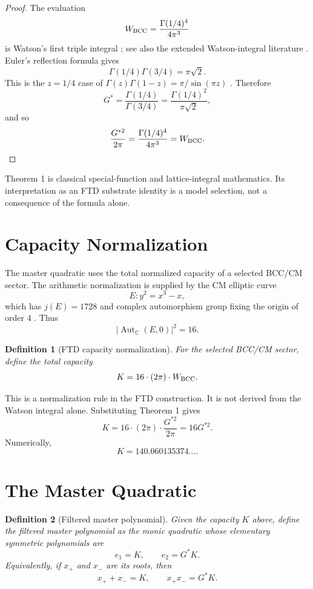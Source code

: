 \documentclass[11pt,letterpaper]{article}
\newtheorem{definition}{Definition}
\begin{document}
\begin{proof}
The evaluation
\[
W_{\rm BCC}=\frac{\Gamma(1/4)^4}{4\pi^3}
\]
is Watson's first triple integral \cite{Watson1939,MathWorldWatson}; see also
the extended Watson-integral literature \cite{GlasserZucker1977,JoyceZucker2005}.
Euler's reflection formula gives
\[
\Gamma(1/4)\Gamma(3/4)=\pi\sqrt{2}.
\]
This is the $z=1/4$ case of
$\Gamma(z)\Gamma(1-z)=\pi/\sin(\pi z)$ \cite{DLMFReflection}.
Therefore
\[
G^*=\frac{\Gamma(1/4)}{\Gamma(3/4)}
   =\frac{\Gamma(1/4)^2}{\pi\sqrt{2}},
\]
and so
\[
\frac{G^{*2}}{2\pi}
=\frac{\Gamma(1/4)^4}{4\pi^3}
=W_{\rm BCC}.
\]
\end{proof}

\noindent Theorem 1 is classical special-function and lattice-integral
mathematics. Its interpretation as an FTD substrate identity is a model
selection, not a consequence of the formula alone.

\section{Capacity Normalization}

The master quadratic uses the total normalized capacity of a selected BCC/CM
sector. The arithmetic normalization is supplied by the CM elliptic curve
\[
E:y^2=x^3-x,
\]
which has $j(E)=1728$ and complex automorphism group fixing the origin of order
$4$ \cite{Silverman2009}. Thus
\[
|\operatorname{Aut}_{\mathbb C}(E,0)|^2=16.
\]

\begin{definition}[FTD capacity normalization]
For the selected BCC/CM sector, define the total capacity
\[
K=16\cdot(2\pi)\cdot W_{\rm BCC}.
\]
\end{definition}

\noindent This is a normalization rule in the FTD construction. It is not
derived from the Watson integral alone. Substituting Theorem 1 gives
\[
K=16\cdot(2\pi)\cdot\frac{G^{*2}}{2\pi}=16G^{*2}.
\]
Numerically,
\[
K=140.060135374\ldots .
\]

\section{The Master Quadratic}

\begin{definition}[Filtered master polynomial]
Given the capacity $K$ above, define the filtered master polynomial as the
monic quadratic whose elementary symmetric polynomials are
\[
e_1=K,\qquad e_2=G^*K.
\]
Equivalently, if $x_+$ and $x_-$ are its roots, then
\[
x_+ + x_- = K,\qquad x_+x_-=G^*K.
\]
\end{definition}
\end{document}
